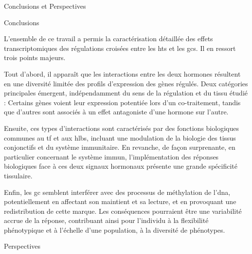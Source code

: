 \documentclass[../main.tex]{subfiles}
\begin{document}
\begin{chapter}{Conclusions et Perspectives}


\begin{section}{Conclusions}

L'ensemble de ce travail a permis la caractérisation détaillée des effets transcriptomiques des régulations croisées entre les \glspl{ht} et les \glspl{gc}.
Il en ressort trois points majeurs.
\par
Tout d'abord, il apparaît que les interactions entre les deux hormones résultent en une diversité limitée des profils d'expression des gènes régulés.
Deux catégories principales émergent, indépendamment du sens de la régulation et du tissu étudié :
Certains gènes voient leur expression potentiée lors d'un co-traitement, tandis que d'autres sont associés à un effet antagoniste d'une hormone sur l'autre.
\par
Ensuite, ces types d'interactions sont caractérisés par des fonctions biologiques communes au \gls{tf} et aux \glspl{hlb}, incluant une modulation de la biologie des tissus conjonctifs et du système immunitaire.
En revanche, de façon surprenante, en particulier concernant le système immun, l'implémentation des réponses biologiques face à ces deux signaux hormonaux présente une grande spécificité tissulaire.
\par
Enfin, les \gls{gc} semblent interférer avec des processus de méthylation de l'\gls{dna}, potentiellement en affectant son maintient et sa lecture, et en provoquant une redistribution de cette marque.
Les conséquences pourraient être une variabilité accrue de la réponse, contribuant ainsi pour l'individu à la flexibilité phénotypique et à l'échelle d'une population, à la diversité de phénotypes.

\end{section}


\begin{section}{Perspectives}


\end{section}
\end{chapter}
\end{document}

